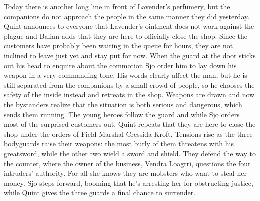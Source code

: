 Today there is another long line in front of Lavender's perfumery, but the companions do not approach the people in the same manner they did yesterday. Quint announces to everyone that Lavender's ointment does not work against the plague and Balian adds that they are here to officially close the shop. Since the customers have probably been waiting in the queue for hours, they are not inclined to leave just yet and stay put for now. When the guard at the door sticks out his head to enquire about the commotion Sjo order him to lay down his weapon in a very commanding tone. His words clearly affect the man, but he is still separated from the companions by a small crowd of people, so he chooses the safety of the inside instead and retreats in the shop. Weapons are drawn and now the bystanders realize that the situation is both serious and dangerous, which sends them running. The young heroes follow the guard and while Sjo orders most of the surprised customers out, Quint repeats that they are here to close the shop under the orders of Field Marshal Cressida Kroft. Tensions rise as the three bodyguards raise their weapons: the most burly of them threatens with his greatsword, while the other two wield a sword and shield. They defend the way to the counter, where the owner of the business, Vendra Loagrri, questions the four intruders' authority. For all she knows they are mobsters who want to steal her money. Sjo steps forward, booming that he's arresting her for obstructing justice, while Quint gives the three guards a final chance to surrender.\\

